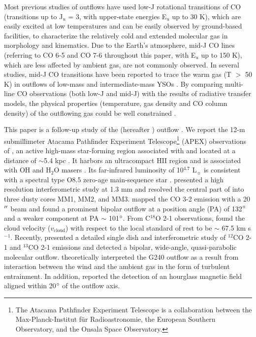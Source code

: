 Most previous studies of outflows have used low-J rotational transitions of CO (transitions up to J$_u$ = 3, with upper-state energies E$_u$ up to 30 K), which are easily excited at low temperatures and can be easily observed by ground-based facilities, to characterize the relatively cold and extended molecular gas in morphology and kinematics. Due to the Earth's atmosphere, mid-J CO lines (referring to CO 6-5 and CO 7-6 throughout this paper, with  E$_u$ up to 150 K), which are less affected by ambient gas, are not commonly observed. In several studies, mid-J CO transitions have been reported to trace the warm gas (T $>$ 50 K) in outflows of low-mass and intermediate-mass YSOs \citep{2009A&A...501..633V, 2009A&A...507.1425V, 2012A&A...542A..86Y, 2016A&A...587A..17V}. By comparing multi-line CO observations (both low-J and mid-J) with the results of radiative transfer models, the physical properties (temperature, gas density and CO column density) of the outflowing gas could be well constrained \citep{2015A&A...581A...4L}. 

This paper is a follow-up study of the  (hereafter ) outflow \citep{2009ApJ...696...66Q}. We report the 12-m submillimeter Atacama Pathfinder Experiment Telescope\footnote{    The Atacama Pathfinder Experiment Telescope is a collaboration between the Max-Planck-Institut f{\"u}r Radioastronomie, the European Southern Observatory, and the Onsala Space Observatory.} (APEX) observations of , an active high-mass star-forming region associated with  and located at a distance of $\sim$5.4 kpc \citep{2014ApJ...790...99C, 2015PASJ...67...69S}. It harbors an ultracompact H{\scriptsize II} region and is associated with OH and H$_2$O masers \citep{1993AJ....105.1495H, 1997MNRAS.289..203C, 1998AJ....116.1897M, 1999ApJS..123..487M, 2003MNRAS.341..551C}. Its far-infrared luminosity of 10$^{4.7}$ L$_\sun$ is consistent with a spectral type O8.5 zero-age main-sequence star \citep{1998AJ....116.1897M}. \citet{2009ApJ...696...66Q} presented a high resolution interferometric study at 1.3 mm and resolved the central part of  into three dusty cores MM1, MM2, and MM3. \citet{2003A&A...412..175K} mapped the CO 3-2 emission with a 20${\mbox{$^{\prime\prime}$}}$ beam and found a prominent bipolar outflow at a position angle (PA) of 132${\mbox{$^\circ$}}$ and a weaker component at PA $\sim$ 101${\mbox{$^\circ$}}$. From C$^{18}$O 2-1 observations, \citet{2003A&A...412..175K} found the cloud velocity ($v_{\mathrm{cloud}}$) with respect to the local standard of rest to be $\sim$ 67.5 km s$^{-1}$. Recently, \citet{2009ApJ...696...66Q} presented a detailed single dish and interferometric study of $^{12}$CO 2-1 and $^{13}$CO 2-1 emissions and detected a bipolar, wide-angle, quasi-parabolic molecular outflow. \citet{2013A&A...559A..23L} theoretically interpreted the G240 outflow as a result from interaction between the wind and the ambient gas in the form of turbulent entrainment. In addition, \citet{2014ApJ...794L..18Q} reported the detection of an hourglass magnetic field aligned within 20${\mbox{$^\circ$}}$ of the outflow axis.

